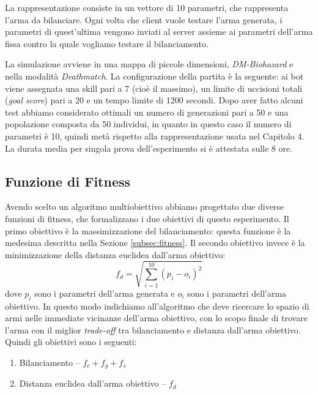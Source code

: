 \documentclass[12pt, italian]{toptesi}
\begin{document}
La rappresentazione consiste in un vettore di 10 parametri, che rappresenta l'arma da bilanciare. Ogni volta che client vuole testare l'arma generata, i parametri di quest'ultima vengono inviati al server assieme ai parametri dell'arma fissa contro la quale vogliamo testare il bilanciamento.

La simulazione avviene in una mappa di piccole dimensioni, \emph{DM-Biohazard} e nella modalità \emph{Deathmatch}. La configurazione della partita è la seguente: ai bot viene assegnata una skill pari a 7 (cioè il massimo), un limite di uccisioni totali (\emph{goal score}) pari a 20 e un tempo limite di 1200 secondi.
Dopo aver fatto alcuni test abbiamo considerato ottimali un numero di generazioni pari a 50 e una popolazione composta da 50 individui, in quanto in questo caso il numero di parametri è 10, quindi metà rispetto alla rappresentazione usata nel Capitolo 4.
La durata media per singola prova dell'esperimento si è attestata sulle 8 ore.

\subsection{Funzione di Fitness}

Avendo scelto un algoritmo multiobiettivo abbiamo progettato due diverse funzioni di fitness, che formalizzano i due obiettivi di questo esperimento.
Il primo obiettivo è la massimizzazione del bilanciamento: questa funzione è la medesima descritta nella Sezione \ref{subsec:fitness}.
Il secondo obiettivo invece è la minimizzazione della distanza euclidea dall'arma obiettivo: 
\begin{equation}
f_d = \sqrt{ \sum_{i=1}^{10} (p_i - o_i)^2}
\end{equation}
dove $p_i$ sono i parametri dell'arma generata e $o_i$ sono i parametri dell'arma obiettivo. 
In questo modo indichiamo all'algoritmo che deve ricercare lo spazio di armi nelle immediate vicinanze dell'arma obiettivo, con lo scopo finale di trovare l'arma con il miglior \emph{trade-off} tra bilanciamento e distanza dall'arma obiettivo.
Quindi gli obiettivi sono i seguenti:
\begin{enumerate}
\item Bilanciamento -- $f_e + f_g + f_s$
\item Distanza euclidea dall'arma obiettivo -- $f_d$
\end{enumerate}
\end{document}
